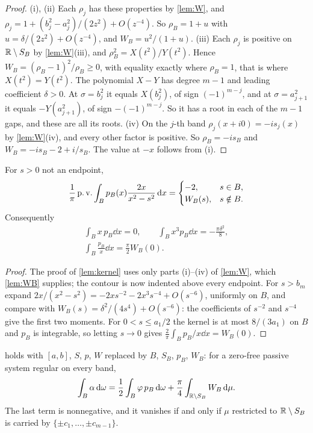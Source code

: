 \begin{proof}
(i), (ii) Each $\rho_j$ has these properties by \cref{lem:W}, and
$\rho_j=1+(b_j^2-a_j^2)/(2z^2)+O(z^{-4})$. So $\rho_B=1+u$ with
$u=\delta/(2z^2)+O(z^{-4})$, and $W_B=u^2/(1+u)$.
(iii) Each $\rho_j$ is positive on $\mathbb R\setminus S_B$ by \cref{lem:W}(iii),
and $\rho_B^2=X(t^2)/Y(t^2)$. Hence $W_B=(\rho_B-1)^2/\rho_B\ge0$, with
equality exactly where $\rho_B=1$, that is where $X(t^2)=Y(t^2)$. The
polynomial $X-Y$ has degree $m-1$ and leading coefficient $\delta>0$. At
$\sigma=b_j^2$ it equals $X(b_j^2)$, of sign $(-1)^{m-j}$, and at
$\sigma=a_{j+1}^2$ it equals $-Y(a_{j+1}^2)$, of sign $-(-1)^{m-j}$. So it
has a root in each of the $m-1$ gaps, and these are all its roots.
(iv) On the $j$-th band $\rho_j(x+i0)=-is_j(x)$ by \cref{lem:W}(iv), and
every other factor is positive. So $\rho_B=-is_B$ and
$W_B=-is_B-2+i/s_B$. The value at $-x$ follows from (i).
\end{proof}

\begin{lemma}\label{lem:kernelB}
For $s>0$ not an endpoint,
\[
\frac1\pi\operatorname{p.v.}\int_Bp_B(x)\frac{2x}{x^2-s^2}\,\mathrm d x=
\begin{cases}-2,&s\in B,\\ W_B(s),&s\notin B.\end{cases}
\]
Consequently
\begin{gather*}
\int_Bx\,p_B\dd x=0,\qquad \int_Bx^3p_B\dd x=-\frac{\pi\delta^2}8,\\
\int_B\frac{p_B}x\dd x=\frac\pi2W_B(0).
\end{gather*}
\end{lemma}

\begin{proof}
The proof of \cref{lem:kernel} uses only parts (i)--(iv) of \cref{lem:W},
which \cref{lem:WB} supplies; the contour is now indented above every
endpoint. For $s>b_m$ expand
$2x/(x^2-s^2)=-2xs^{-2}-2x^3s^{-4}+O(s^{-6})$, uniformly on $B$, and compare
with $W_B(s)=\delta^2/(4s^4)+O(s^{-6})$: the coefficients of $s^{-2}$ and
$s^{-4}$ give the first two moments. For $0<s\le a_1/2$ the kernel is
at most $8/(3a_1)$ on $B$ and $p_B$ is integrable, so letting $s\to0$ gives $\frac2\pi\int_Bp_B/x\dd x=W_B(0)$.
\end{proof}

\begin{theorem}\label{thm:sumruleB}
 holds with $[a,b]$, $S$, $p$, $W$ replaced by $B$, $S_B$,
$p_B$, $W_B$: for a zero-free passive system regular on every band,
\[
\int_B\alpha\,\mathrm d\omega=\frac12\int_B\varphi\,p_B\,\mathrm d\omega+\frac\pi4\int_{\mathbb R\setminus S_B}W_B\,\mathrm d\mu .
\]
The last term is nonnegative, and it vanishes if and only if $\mu$ restricted
to $\mathbb R\setminus S_B$ is carried by $\{\pm c_1,\dots,\pm c_{m-1}\}$.
\end{theorem}

